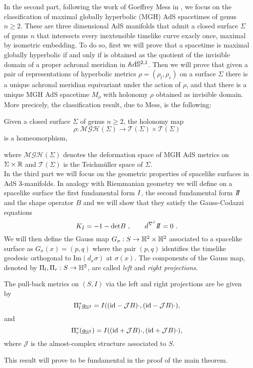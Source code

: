 In the second part, following the work of Goeffrey Mess in \cite{Mess}, we focus on the classification of maximal globally hyperbolic (MGH) AdS spacetimes of genus $n\geq 2$. These are three dimensional AdS manifolds that admit a closed surface $\Sigma$ of genus $n$ that intersects every inextensible timelike curve exacly once, maximal by isometric embedding.
To do so, first we will prove that a spacetime is maximal globally hyperbolic if and only if is obtained as the quotient of the invisible domain of a proper achronal meridian in $\mathbb{A}\mathrm{d}\mathbb{S}^{2,1}$. Then we will prove that given a pair of representations of hyperbolic metrics $\rho=(\rho_l, \rho_r)$ on a surface $\Sigma$ there is a unique achronal meridian equivariant under the action of $\rho$, and that there is a unique MGH AdS spacetime $M_\rho$ with holonomy $\rho$ obtained as invisible domain. More precicely, the classification result, due to Mess, is the following:
\begin{theorem*}
Given a closed surface $\Sigma$ of genus $n\geq 2$, the holonomy map $$\rho:\mathcal{MGH}(\Sigma)\to\mathcal{T}(\Sigma)\times\mathcal{T}(\Sigma)$$ is a homeomorphism,
\end{theorem*}
\noindent where $\mathcal{MGH}(\Sigma)$ denotes the deformation space of MGH AdS metrics on $\Sigma\times \mathbb{R}$ and $\mathcal{T}(\Sigma)$ is the Teichm\"uller space of $\Sigma$.\\

In the third part we will focus on the geometric properties of spacelike surfaces in AdS 3-manifolds. In analogy with Riemmanian geometry we will define on a spacelike surface the first fundamental form $I$, the second fundamental form $\II$ and the shape operator $B$ and we will show that they satisfy the Gauss-Codazzi equations   
    \[
        K_\I = -1 - \text{det}B \ , \qquad d^{\nabla^\I}\II=0 \ .
    \]
We will then define the Gauss map $G_\sigma : S \to \mathbb{H}^2 \times \mathbb{H}^2$ associated to a spacelike surface as $G_\sigma(x) = (p,q)$ where the pair $(p,q)$ identifies the timelike geodesic orthogonal to $\text{Im}(d_x\sigma)$ at $\sigma(x)$. The components of the Gauss map, denoted by $\Pi_l, \Pi_r : S \to \mathbb{H}^2$, are called \textit{left} and \textit{right projections}.
\begin{proposition*}
    The pull-back metrics on $(S,I)$ via the left and right projections are be given by
    \[
        \Pi_l^*g_{\mathbb{H}^2}=I((\text{id}-\mathcal{J}B)\cdot,(\text{id}-\mathcal{J}B)\cdot),
    \]
        and
    \[
        \Pi_r^*(g_{\mathbb{H}^2})=I((\text{id}+\mathcal{J}B)\cdot,(\text{id}+\mathcal{J}B)\cdot),
    \]
where $\mathcal{J}$ is the almost-complex structure associated to $S$.
\end{proposition*}
This result will prove to be fundamental in the proof of the main theorem.\\

